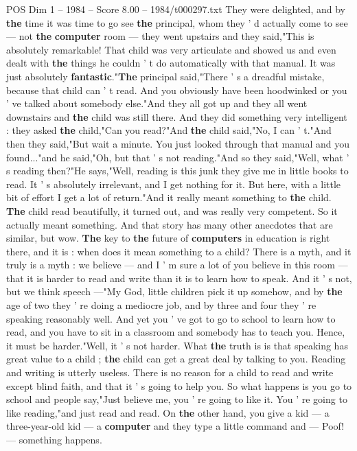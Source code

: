 \begin{textsample}{POS Dim 1 – 1984 – Score 8.00 – 1984/t000297.txt}
They were delighted, and by \textbf{the} time it was time to go see \textbf{the} principal, whom they ' d actually come to see — not \textbf{the} \textbf{computer} room — they went upstairs and they said,"This is absolutely remarkable!
That child was very articulate and showed us and even dealt with \textbf{the} things he couldn ' t do automatically with that manual.
It was just absolutely \textbf{fantastic}."\textbf{The} principal said,"There ' s a dreadful mistake, because that child can ' t read.
And you obviously have been hoodwinked or you ' ve talked about somebody else."And they all got up and they all went downstairs and \textbf{the} child was still there.
And they did something very intelligent : they asked \textbf{the} child,"Can you read?"And \textbf{the} child said,"No, I can ' t."And then they said,"But wait a minute.
You just looked through that manual and you found..."and he said,"Oh, but that ' s not reading."And so they said,"Well, what ' s reading then?"He says,"Well, reading is this junk they give me in little books to read.
It ' s absolutely irrelevant, and I get nothing for it.
But here, with a little bit of effort I get a lot of return."And it really meant something to \textbf{the} child. \textbf{The} child read beautifully, it turned out, and was really very competent.
So it actually meant something.
And that story has many other anecdotes that are similar, but wow. \textbf{The} key to \textbf{the} future of \textbf{computers} in education is right there, and it is : when does it mean something to a child?
There is a myth, and it truly is a myth : we believe — and I ' m sure a lot of you believe in this room — that it is harder to read and write than it is to learn how to speak.
And it ' s not, but we think speech —"My God, little children pick it up somehow, and by \textbf{the} age of two they ' re doing a mediocre job, and by three and four they ' re speaking reasonably well.
And yet you ' ve got to go to school to learn how to read, and you have to sit in a classroom and somebody has to teach you.
Hence, it must be harder."Well, it ' s not harder.
What \textbf{the} truth is is that speaking has great value to a child ; \textbf{the} child can get a great deal by talking to you.
Reading and writing is utterly useless.
There is no reason for a child to read and write except blind faith, and that it ' s going to help you.
So what happens is you go to school and people say,"Just believe me, you ' re going to like it.
You ' re going to like reading,"and just read and read.
On \textbf{the} other hand, you give a kid — a three-year-old kid — a \textbf{computer} and they type a little command and — Poof! — something happens.

\end{textsample}
